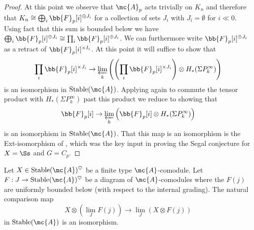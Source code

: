 \begin{proof}
    At this point we observe that $\mc{A}_p$ acts trivially on $K_n$
    and therefore that $K_n \cong \bigoplus_{i} \bb{F}_p[i]^{\oplus J_i}$ for a collection of sets $J_i$ with $J_i = \emptyset$ 
    for $i \ll 0$. Using fact that this sum is bounded below we have 
    $\bigoplus_{i} \bb{F}_p[i]^{\oplus J_i} \cong \prod_{i} \bb{F}_p[i]^{\oplus J_i} $.
    We can furthermore write $\bb{F}_p[i]^{\oplus J_i}$ as a retract of $\bb{F}_p[i]^{\times I_i}$. At this point it will suffice to show that
    \[ \prod_{i} \bb{F}_p[i]^{\times J_i} \to \varprojlim_k \left( \left( \prod_{i} \bb{F}_p[i]^{\times J_i} \right) \otimes H_{*}(\Sigma P^{\infty}_{k}) \right) \]
    is an isomorphism in $\mathrm{Stable}(\mc{A})$.
    Applying  again to commute the tensor product with $H_{*}(\Sigma P^{\infty}_{k})$ past this product we reduce to showing that
    $$\bb{F}_p[i] \rightarrow \varprojlim_k \left( \bb{F}_p[i] \otimes H_{*}(\Sigma P^{\infty}_{k}) \right) $$
    is an isomorphism in $\mathrm{Stable}(\mc{A})$.
    That this map is an isomorphism is the Ext-isomorphism of \cite{lin1980conjectures, lin1980calculation, gunawardena1980segal}, which was the key input in proving the Segal conjecture for $X=\Ss$ and $G=C_p$. 
\end{proof}

\begin{lem} \label{lem:colimlim}
    Let $X \in \mathrm{Stable}(\mc{A})^\heartsuit$ be a finite type $\mc{A}$-comodule.
    Let $F : J \to \mathrm{Stable}(\mc{A})^\heartsuit$ be a diagram of $\mc{A}$-comodules where 
    the $F(j)$ are uniformly bounded below (with respect to the internal grading).
    The natural comparison map 
    \[ X \otimes \left( \lim_{J} F(j) \right) \to  \lim_J \left( X \otimes F(j) \right) \]
    in $\mathrm{Stable}(\mc{A})$ is an isomorphism.
\end{lem}


